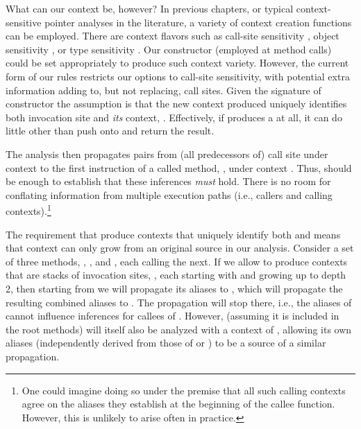 What can our context be, however? In previous chapters, or typical context-sensitive pointer analyses in the literature, a variety of context creation functions can be employed. There are context flavors such as call-site sensitivity \cite{col:1981:Sharir,thesis:Shivers}, object sensitivity \cite{issta:2002:Milanova,article:2005:Milanova}, or type sensitivity \cite{popl:2011:Smaragdakis}. Our  constructor (employed at method calls) could be set appropriately to produce such context variety. However, the current form of our rules restricts our options to call-site sensitivity, with potential extra information adding to, but not replacing, call sites. Given the signature of constructor  the assumption is that the new context produced uniquely identifies both invocation site  and \emph{its} context, . Effectively, if  produces a  at all, it can do little other than push  onto  and return the result.

The analysis then propagates  pairs from (all predecessors of) call site  under context  to the first instruction of a called method, , under context . Thus,  should be enough to establish that these inferences \emph{must} hold. There is no room for conflating information from multiple execution paths (i.e., callers and calling contexts).\footnote{One could imagine doing so under the premise that all such calling contexts agree on the aliases they establish at the beginning of the callee function. However, this is unlikely to arise often in practice.}

The requirement that  produce contexts that uniquely identify both  and  means that context can only grow from an original source in our analysis. Consider a set of three methods, , , and , each calling the next. If we allow  to produce contexts that are stacks of invocation sites, , each starting with \ctxAll{} and growing up to depth 2, then starting from  we will propagate its aliases to , which will propagate the resulting combined aliases to . The propagation will stop there, i.e., the aliases of  cannot influence inferences for callees of . However,  (assuming it is included in the root methods) will itself also be analyzed with a context of \ctxAll{}, allowing its own aliases (independently derived from those of  or ) to be a source of a similar propagation.


